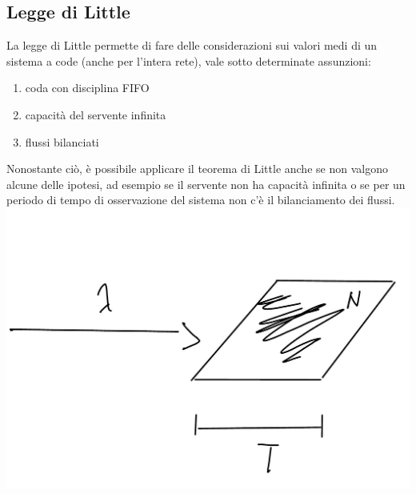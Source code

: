 \documentclass{article}
\begin{document}
\subsection{Legge di Little}
La legge di Little permette di fare delle considerazioni sui valori medi di un sistema a code (anche per l'intera rete), vale sotto determinate assunzioni:
\begin{enumerate}
\item coda con disciplina FIFO
\item capacità del servente infinita
\item flussi bilanciati
\end{enumerate}
Nonostante ciò, è possibile applicare il teorema di Little anche se non valgono alcune delle ipotesi, ad esempio se il servente non ha capacità infinita o se per un periodo di tempo di osservazione del sistema non c'è il bilanciamento dei flussi.\\
\includegraphics[scale=0.3]{images/PMCSN-903-1.jpeg}\\
\end{document}
